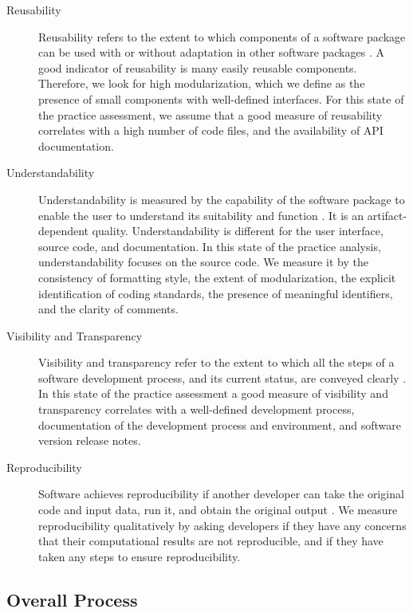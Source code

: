 \documentclass[final, 3p, times, authoryear]{elsarticle}
\begin{document}
\begin{description}
	\item[Reusability] Reusability refers to the extent to which components of a
	software package can be used with or without adaptation in other software
	packages \citep{kalagiakos2003non}. A good indicator of reusability is many
	easily reusable components. Therefore, we look for high modularization,
	which we define as the presence of small components with well-defined
	interfaces. For this state of the practice assessment, we assume that a good
	measure of reusability correlates with a high number of code files, and the
	availability of API documentation. 

	\item[Understandability] Understandability is measured by the capability of
	the software package to enable the user to understand its suitability and
	function \citep{ISO9126}. It is an artifact-dependent quality.
	Understandability is different for the user interface, source code, and
	documentation. In this state of the practice analysis, understandability
	focuses on the source code. We measure it by the consistency of formatting
	style, the extent of modularization, the explicit identification of coding
	standards, the presence of meaningful identifiers, and the clarity of
	comments.

	\item[Visibility and Transparency] Visibility and transparency refer to the
	extent to which all the steps of a software development process, and its
	current status, are conveyed clearly \citep[p.\ 32]{GhezziEtAl2003}. In this
	state of the practice assessment a good measure of visibility and
	transparency correlates with a well-defined development process,
	documentation of the development process and environment, and software
	version release notes.

	\item[Reproducibility] Software achieves reproducibility if another
	developer can take the original code and input data, run it, and obtain the
	original output \citep{BenureauAndRougier2017}. We measure reproducibility
	qualitatively by asking developers if they have any concerns that their
	computational results are not reproducible, and if they have taken any
	steps to ensure reproducibility.

\end{description}

\subsection{Overall Process} \label{Sec_OverallProcess}
\end{document}

